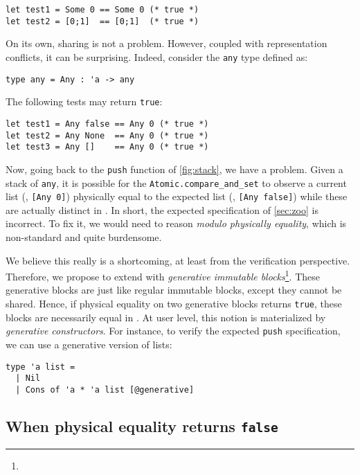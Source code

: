 \begin{verbatim}
let test1 = Some 0 == Some 0 (* true *)
let test2 = [0;1]  == [0;1]  (* true *)
\end{verbatim}

On its own, sharing is not a problem.
However, coupled with representation conflicts, it can be surprising.
Indeed, consider the \texttt{any} type defined as:

\begin{verbatim}
type any = Any : 'a -> any
\end{verbatim}

The following tests may return \texttt{true}:

\begin{verbatim}
let test1 = Any false == Any 0 (* true *)
let test2 = Any None  == Any 0 (* true *)
let test3 = Any []    == Any 0 (* true *)
\end{verbatim}

Now, going back to the \texttt{push} function of \cref{fig:stack}, we have a problem.
Given a stack of \texttt{any}, it is possible for the \texttt{Atomic.compare_and_set} to observe a current list (\eg, \texttt{[Any 0]}) physically equal to the expected list (\eg, \texttt{[Any false]}) while these are actually distinct in \Rocq.
In short, the expected specification of \cref{sec:zoo} is incorrect.
To fix it, we would need to reason \emph{modulo physically equality}, which is non-standard and quite burdensome.

We believe this really is a shortcoming, at least from the verification perspective.
Therefore, we propose to extend \OCaml with \emph{generative immutable blocks}\footnote{}.
These generative blocks are just like regular immutable blocks, except they cannot be shared.
Hence, if physical equality on two generative blocks returns \texttt{true}, these blocks are necessarily equal in \Rocq.
At user level, this notion is materialized by \emph{generative constructors}.
For instance, to verify the expected \texttt{push} specification, we can use a generative version of lists:

\begin{verbatim}
type 'a list =
  | Nil
  | Cons of 'a * 'a list [@generative]
\end{verbatim}

\subsection{When physical equality returns \texttt{false}}

